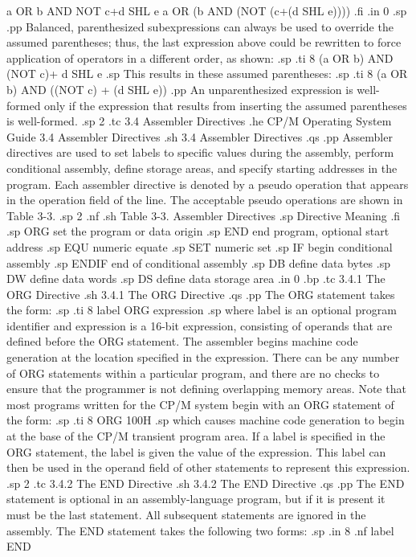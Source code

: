 a OR b AND NOT c+d SHL e    a OR (b AND (NOT (c+(d SHL e))))
.fi
.in 0
.sp
.pp
Balanced, parenthesized subexpressions can always be used to 
override the assumed parentheses; thus, the last expression above 
could be rewritten to force application of operators in a 
different order, as shown:
.sp
.ti 8
(a OR b) AND (NOT c)+ d SHL e
.sp
This results in these assumed parentheses:
.sp
.ti 8
(a OR b) AND ((NOT c) + (d SHL e))
.pp
An unparenthesized expression is well-formed only if the 
expression that results from inserting the assumed parentheses is 
well-formed.
.sp 2
.tc    3.4  Assembler Directives
.he CP/M Operating System Guide             3.4  Assembler Directives
.sh
3.4  Assembler Directives
.qs
.pp
Assembler directives are used to set labels to specific values 
during the assembly, perform conditional assembly, define storage 
areas, and specify starting addresses in the program.  Each 
assembler directive is denoted by a pseudo operation that appears 
in the operation field of the line.  The acceptable pseudo operations
are shown in Table 3-3.
.sp 2
.nf
.sh
                Table 3-3.  Assembler Directives
.sp
        Directive                 Meaning
.fi
.sp
          ORG       set the program or data origin
.sp
          END       end program, optional start address
.sp
          EQU       numeric equate
.sp
          SET       numeric set
.sp
          IF        begin conditional assembly
.sp
          ENDIF     end of conditional assembly
.sp
          DB        define data bytes
.sp
          DW        define data words
.sp
          DS        define data storage area
.in 0
.bp
.tc         3.4.1  The ORG Directive
.sh
3.4.1  The ORG Directive
.qs
.pp
The ORG statement takes the form:
.sp
.ti 8
label  ORG  expression
.sp
where label is an optional program identifier and expression is 
a 16-bit expression, consisting of operands that are defined 
before the ORG statement.  The assembler begins machine code 
generation at the location specified in the expression.  There 
can be any number of ORG statements within a particular program, 
and there are no checks to ensure that the programmer is not 
defining overlapping memory areas.  Note that 
most programs written for the CP/M system begin with an ORG 
statement of the form:
.sp
.ti 8
ORG  100H
.sp
which causes machine code generation to begin at the base of the 
CP/M transient program area.  If a label is specified in the ORG 
statement, the label is given the value of the expression.  This 
label can then be used in the operand field of other statements 
to represent this expression.
.sp 2
.tc         3.4.2  The END Directive
.sh
3.4.2  The END Directive
.qs
.pp
The END statement is optional in an assembly-language program, 
but if it is present it must be the last statement.  All 
subsequent statements are ignored in the assembly.  The END 
statement takes the following two forms:
.sp
.in 8
.nf
label END

